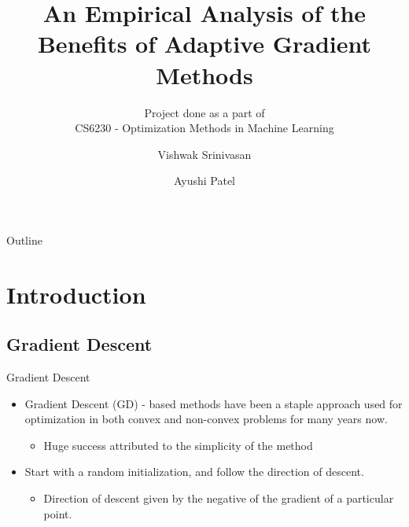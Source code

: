 \documentclass[10pt]{beamer}
\title[Analysis of AG Methods]{An Empirical Analysis of the Benefits of Adaptive Gradient Methods}
\subtitle{Project done as a part of \\
CS6230 - Optimization Methods in Machine Learning}
\author{Vishwak Srinivasan \and Ayushi Patel}
\newcommand{\g}{\nabla}
\newcommand{\xbold}{\mathbf{x}}
\begin{document}
\begin{frame}
\titlepage
\end{frame}

\begin{frame}{Outline}
\tableofcontents
\end{frame}

\section{Introduction}
\subsection{Gradient Descent}
\begin{frame}{Gradient Descent}
\begin{itemize}
\item<1->{Gradient Descent (GD) - based methods have been a staple approach used for optimization
          in both convex and non-convex problems for many years now.
          \begin{itemize}
          \item<2->{Huge success attributed to the simplicity of the method}
          \end{itemize}
         }
\item<3->{Start with a random initialization, and follow the direction of descent.
          \begin{itemize}
          \item<4->{Direction of descent given by the negative of the gradient of a particular point.}
          \end{itemize}
         }
\uncover<5->{\[\xbold := \xbold - \eta \g f(\xbold)\]}
\end{itemize}
\end{frame}
\end{document}
